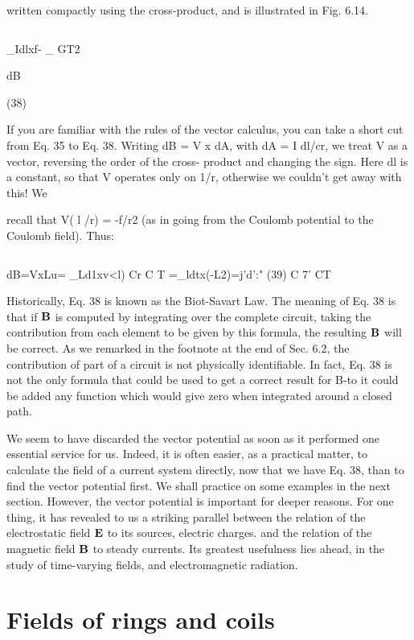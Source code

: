 written compactly using the cross-product, and is illustrated in
Fig. 6.14.

\begin{equation}
\end{equation}

_Idlxf-
_ GT2

dB

(38)

If you are familiar with the rules of the vector calculus, you can take
a short cut from Eq. 35 to Eq. 38. Writing dB = V x dA, with
dA = I dl/cr, we treat V as a vector, reversing the order of the cross-
product and changing the sign. Here dl is a constant, so that V
operates only on 1/r, otherwise we couldn't get away with this! We

recall that V( l /r) = -f/r2 (as in going from the Coulomb potential
to the Coulomb field). Thus:

\begin{equation}
\end{equation}

dB=VxLu= _Ld1xv<l)
Cr C T
=_ldtx(-L2)=j'd':" (39)
C 7' CT

Historically, Eq. 38 is known as the Biot-Savart Law. The meaning
of Eq. 38 is that if $\mathbf{B}$ is computed by integrating over the complete
circuit, taking the contribution from each element to be given by this
formula, the resulting $\mathbf{B}$ will be correct. As we remarked in the footnote
at the end of Sec. 6.2, the contribution of part of a circuit is not
physically identifiable. In fact, Eq. 38 is not the only formula that
could be used to get a correct result for B-to it could be added any
function which would give zero when integrated around a closed
path.

We seem to have discarded the vector potential as soon as it performed
one essential service for us. Indeed, it is often easier, as a
practical matter, to calculate the field of a current system directly,
now that we have Eq. 38, than to find the vector potential first. We
shall practice on some examples in the next section. However, the
vector potential is important for deeper reasons. For one thing, it
has revealed to us a striking parallel between the relation of the electrostatic
field $\mathbf{E}$ to its sources, electric charges. and the relation of the
magnetic field $\mathbf{B}$ to steady currents. Its greatest usefulness lies ahead,
in the study of time-varying fields, and electromagnetic radiation.

\section{Fields of rings and coils}


